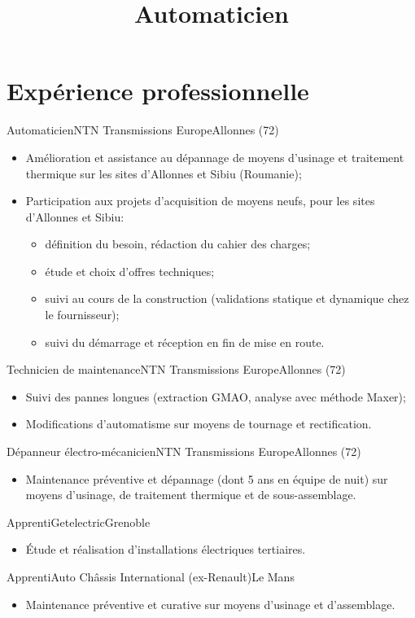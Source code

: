 \documentclass[a4paper,french,11pt]{moderncv}
\title{Automaticien}
\begin{document}
\maketitle

\section{Expérience professionnelle}
%
  {Automaticien}{NTN Transmissions Europe}{Allonnes (72)}{}{%
    \begin{itemize}
      \item Amélioration et assistance au dépannage de moyens d'usinage et
      traitement thermique sur les sites d'Allonnes et Sibiu (Roumanie);
      \item Participation aux projets d'acquisition de moyens neufs, pour les
      sites d'Allonnes et Sibiu:
      \begin{itemize}
        \item définition du besoin, rédaction du cahier des charges;
        \item étude et choix d'offres techniques;
        \item suivi au cours de la construction (validations statique et
        dynamique chez le fournisseur);
        \item suivi du démarrage et réception en fin de mise en route.
      \end{itemize}
    \end{itemize}
  }
%
  {Technicien de maintenance}{NTN Transmissions Europe}{Allonnes (72)}{}{%
    \begin{itemize}
      \item Suivi des pannes longues (extraction GMAO, analyse avec méthode
      Maxer);
      \item Modifications d'automatisme sur moyens de tournage et rectification.
    \end{itemize}
  }
%
  {Dépanneur électro-mécanicien}{NTN Transmissions Europe}{Allonnes (72)}{}{%
    \begin{itemize}
      \item Maintenance préventive et dépannage (dont 5 ans en équipe de nuit)
      sur moyens d'usinage, de traitement thermique et de sous-assemblage.
    \end{itemize}
  }
%
  {Apprenti}{Getelectric}{Grenoble}{}{%
    \begin{itemize}
      \item Étude et réalisation d'installations électriques tertiaires.
    \end{itemize}
  }
%
  {Apprenti}{Auto Châssis International (ex-Renault)}{Le Mans}{}{%
    \begin{itemize}
      \item Maintenance préventive et curative sur moyens d'usinage et
      d'assemblage.
    \end{itemize}
  }
\end{document}
